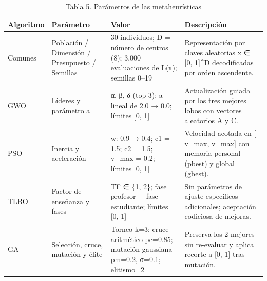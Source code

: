 \begin{table}[htbp]
  \centering
  \caption{Tabla 5. Parámetros de las metaheurísticas}
  \label{tab:tabla-5-parametros-metaheuristicas}
  \begin{tabular}{llll}
    \toprule
    Algoritmo & Parámetro & Valor & Descripción \\
    \midrule
    Comunes & Población / Dimensión / Presupuesto / Semillas & 30 individuos; D = número de centros (8); 3,000 evaluaciones de L(π); semillas 0–19 & Representación por claves aleatorias x ∈ [0, 1]\textasciicircum{}D decodificadas por orden ascendente. \\
    GWO & Líderes y parámetro a & α, β, δ (top-3); a lineal de 2.0 → 0.0; límites [0, 1] & Actualización guiada por los tres mejores lobos con vectores aleatorios A y C. \\
    PSO & Inercia y aceleración & w: 0.9 → 0.4; c1 = 1.5; c2 = 1.5; v\_max = 0.2; límites [0, 1] & Velocidad acotada en [-v\_max, v\_max] con memoria personal (pbest) y global (gbest). \\
    TLBO & Factor de enseñanza y fases & TF ∈ \{1, 2\}; fase profesor + fase estudiante; límites [0, 1] & Sin parámetros de ajuste específicos adicionales; aceptación codiciosa de mejoras. \\
    GA & Selección, cruce, mutación y élite & Torneo k=3; cruce aritmético pc=0.85; mutación gaussiana pm=0.2, σ=0.1; elitismo=2 & Preserva los 2 mejores sin re-evaluar y aplica recorte a [0, 1] tras mutación. \\
    \bottomrule
  \end{tabular}
\end{table}
